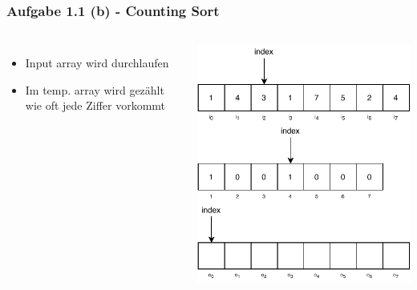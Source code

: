 \documentclass[aspectratio=169]{beamer}
\begin{document}
\begin{frame}
	\frametitle{Aufgabe 1.1 (b) - Counting Sort}
	\begin{columns}[c] %
	
	\begin{itemize}
		\item Input array wird durchlaufen
		\item Im temp. array wird gezählt wie oft jede Ziffer vorkommt
	\end{itemize}
	
	\includegraphics[scale=.7]{cs2.pdf}
	
	\end{columns}
	\end{frame}
\end{document}
